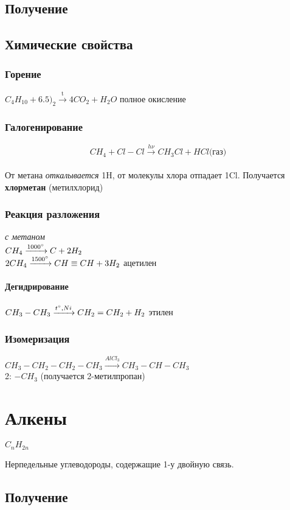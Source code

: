\documentclass[a4paper]{article}
\begin{document}
\subsection{Получение}
\subsection{Химические свойства}
	\subsubsection{Горение}
	$C_{4}H_{10}+6.5)_{2}  \xrightarrow{\text{t}} 4CO_{2}+H_{2}O$
	полное окисление
	\subsubsection{Галогенирование}
	$$CH_{4}+Cl-Cl \xrightarrow{h\nu} CH_{3}Cl+HCl \text{(газ)}$$\\
	От метана \textit{откалывается} 1H, от молекулы хлора отпадает 1Cl.
	Получается \textbf{хлорметан} (метилхлорид)
	\subsubsection{Реакция разложения}
	\textit{с метаном}\\
	$CH_{4} \xrightarrow{1000 \degree} C+2H_2$\\
	$2CH_{4} \xrightarrow{1500 \degree} CH \equiv CH+3H_{2}$ ацетилен\\
	\paragraph{Дегидрирование}
	$CH_{3}-CH_{3} \xrightarrow{t \degree,Ni} CH_{2}=CH_{2}+H_{2}$ этилен
	\subsubsection{Изомеризация}
	$CH_{3}-CH_{2}-CH_{2}-CH_{3} \xrightarrow{AlCl_{3}} CH_3-CH-CH_{3}$\\
	2: $-CH_{3}$ (получается 2-метилпропан)
\pagebreak

\section{Алкены} \begin{flushright} $C_{n}H_{2n}$ \end{flushright}
Нерпедельные углеводороды, содержащие 1-у двойную связь.
\subsection{Получение}
\end{document}
